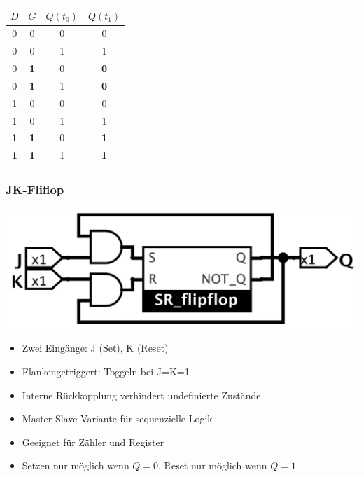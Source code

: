 \documentclass[a4paper,6pt]{article}
\begin{document}
\begin{multicols*}{3}
\begin{center}
    \begin{tabular}{|c|c||c|c|}
    \hline
    $D$ & $G$ & $Q(t_0)$ & $Q(t_1)$ \\ \hline
    0 & 0 & 0 & 0 \\ \hline
    0 & 0 & 1 & 1 \\ \hline
    0 & \textbf{1} & 0 & \textbf{0} \\ \hline
    0 & \textbf{1} & 1 & \textbf{0} \\ \hline
    1 & 0 & 0 & 0 \\ \hline
    1 & 0 & 1 & 1 \\ \hline
    \textbf{1} & \textbf{1} & 0 & \textbf{1} \\ 
    \textbf{1} & \textbf{1} & 1 & \textbf{1} \\ \hline
    \end{tabular}
\end{center}

\subsubsection*{JK-Fliflop}



\begin{center}
    \includegraphics[width=0.75\linewidth]{resources/JK_FlipFlop.png}
\end{center}

\begin{itemize}
    \item Zwei Eingänge: J (Set), K (Reset)
    \item Flankengetriggert: Toggeln bei J=K=1
    \item Interne Rückkopplung verhindert undefinierte Zustände
    \item Master-Slave-Variante für sequenzielle Logik
    \item Geeignet für Zähler und Register
    \item Setzen nur möglich wenn $Q = 0$, Reset nur möglich wenn $Q = 1$
\end{itemize}


\end{multicols*}
\end{document}
